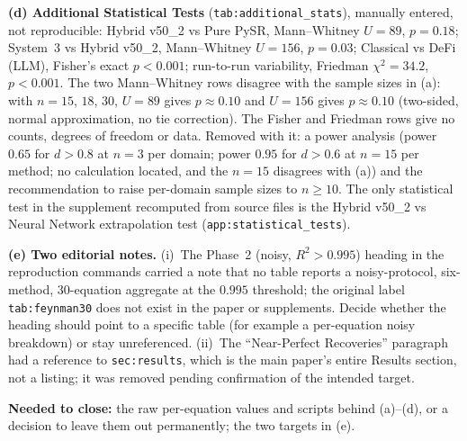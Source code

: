 \documentclass[11pt]{article}
\newcommand{\Rsq}{R^{2}}
\begin{document}
\textbf{(d) Additional Statistical Tests} (\texttt{tab:additional\_stats}), manually entered, not reproducible:
Hybrid v50\_2 vs Pure PySR, Mann--Whitney $U=89$, $p=0.18$; System~3 vs Hybrid v50\_2, Mann--Whitney $U=156$, $p=0.03$;
Classical vs DeFi (LLM), Fisher's exact $p<0.001$; run-to-run variability, Friedman $\chi^2=34.2$, $p<0.001$. The two
Mann--Whitney rows disagree with the sample sizes in (a): with $n=15$, $18$, $30$, $U=89$ gives $p\approx0.10$ and $U=156$
gives $p\approx0.10$ (two-sided, normal approximation, no tie correction). The Fisher and Friedman rows give no counts,
degrees of freedom or data. Removed with it: a power analysis (power $0.65$ for $d>0.8$ at $n=3$ per domain; power $0.95$ for
$d>0.6$ at $n=15$ per method; no calculation located, and the $n=15$ disagrees with (a)) and the recommendation to raise
per-domain sample sizes to $n\ge10$. The only statistical test in the supplement recomputed from source files is the Hybrid
v50\_2 vs Neural Network extrapolation test (\texttt{app:statistical\_tests}).

\textbf{(e) Two editorial notes.} (i)~The Phase~2 (noisy, $\Rsq>0.995$) heading in the reproduction commands carried a
note that no table reports a noisy-protocol, six-method, 30-equation aggregate at the $0.995$ threshold; the original label
\texttt{tab:feynman30} does not exist in the paper or supplements. Decide whether the heading should point to a specific
table (for example a per-equation noisy breakdown) or stay unreferenced. (ii)~The ``Near-Perfect Recoveries'' paragraph had
a reference to \texttt{sec:results}, which is the main paper's entire Results section, not a listing; it was removed pending
confirmation of the intended target.

\textbf{Needed to close:} the raw per-equation values and scripts behind (a)--(d), or a decision to leave them out
permanently; the two targets in (e).
\end{document}
